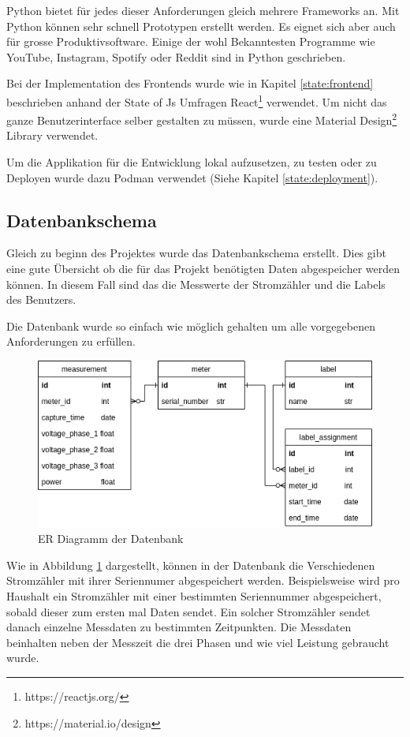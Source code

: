 Python bietet für jedes dieser Anforderungen gleich mehrere Frameworks an. Mit Python können sehr
schnell Prototypen erstellt werden. Es eignet sich aber auch für grosse Produktivsoftware.
Einige der wohl Bekanntesten Programme wie YouTube, Instagram, Spotify oder Reddit sind
in Python geschrieben. \cite{popular_python_sw}

Bei der Implementation des Frontends wurde wie in Kapitel \ref{state:frontend} beschrieben
anhand der State of Js Umfragen React\footnote{https://reactjs.org/} verwendet.
Um nicht das ganze Benutzerinterface selber gestalten zu müssen, wurde eine Material Design\footnote{https://material.io/design}
Library verwendet.

Um die Applikation für die Entwicklung lokal aufzusetzen, zu testen oder zu Deployen wurde dazu
Podman verwendet (Siehe Kapitel \ref{state:deployment}).

\subsection{Datenbankschema}

Gleich zu beginn des Projektes wurde das Datenbankschema erstellt.
Dies gibt eine gute Übersicht ob die für das Projekt benötigten Daten
abgespeicher werden können. In diesem Fall sind das die Messwerte der Stromzähler
und die Labels des Benutzers.

Die Datenbank wurde so einfach wie möglich gehalten um alle vorgegebenen
Anforderungen zu erfüllen.

\begin{figure}[h]
    \centering
    \includegraphics[width=1.0\textwidth]{gfx/smic-db}
    \caption{
        ER Diagramm der Datenbank
    }
    \label{fig:smic-db}
\end{figure}

Wie in Abbildung \ref{fig:smic-db} dargestellt, können in der Datenbank
die Verschiedenen Stromzähler mit ihrer Seriennumer abgespeichert werden.
Beispielsweise wird pro Haushalt ein Stromzähler mit einer bestimmten
Seriennummer abgespeichert, sobald dieser zum ersten mal Daten sendet.
Ein solcher Stromzähler sendet danach einzelne Messdaten zu bestimmten
Zeitpunkten. Die Messdaten beinhalten neben der Messzeit die drei Phasen
und wie viel Leistung gebraucht wurde.

